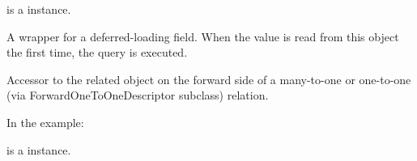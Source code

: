 \documentclass[letterpaper,10pt,english]{sphinxmanual}
\begin{document}
\begin{fulllineitems}
\begin{fulllineitems}
%
\begin{sphinxVerbatim}[commandchars=\\\{\}]
 
       
\end{sphinxVerbatim}

 is a  instance.

\end{fulllineitems}


\begin{fulllineitems}
\label{\detokenize{QuChemPedIA.models:QuChemPedIA.models.ImportRuleModel.ImportRule.id_software_id}}
A wrapper for a deferred-loading field. When the value is read from this
object the first time, the query is executed.

\end{fulllineitems}


\begin{fulllineitems}
\label{\detokenize{QuChemPedIA.models:QuChemPedIA.models.ImportRuleModel.ImportRule.id_version}}
Accessor to the related object on the forward side of a many-to-one or
one-to-one (via ForwardOneToOneDescriptor subclass) relation.

In the example:

%
\begin{sphinxVerbatim}[commandchars=\\\{\}]
 
       
\end{sphinxVerbatim}

 is a  instance.


\end{fulllineitems}
\end{fulllineitems}
\end{document}
